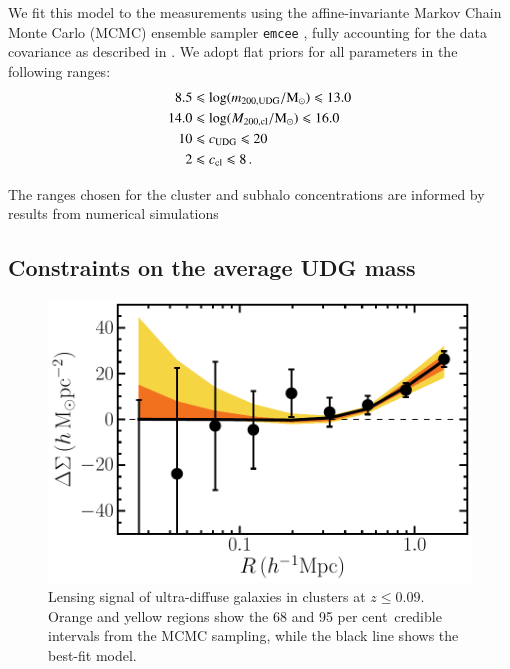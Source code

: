 \documentclass[usenatbib,fleqn]{mnras}
\def\percent{ per cent}
\begin{document}
We fit this model to the measurements using the affine-invariante Markov Chain Monte Carlo (MCMC) ensemble sampler \texttt{emcee} \citep{foreman13}, fully accounting for the data covariance as described in \cite{sifon15_kids,sifon17}. We adopt flat priors for all parameters in the following ranges:
\begin{equation}
\begin{split}
  8.5 &\leqslant \log(m_\mathrm{200,UDG}/\mathrm{M}_\odot) \leqslant 13.0 \\
 14.0 &\leqslant \log(M_\mathrm{200,cl}/\mathrm{M}_\odot) \leqslant 16.0 \\
   10 &\leqslant c_\mathrm{UDG} \leqslant 20 \\
    2 &\leqslant c_\mathrm{cl} \leqslant 8
 \,.
\end{split}
\end{equation}

The ranges chosen for the cluster and subhalo concentrations are informed by results from numerical simulations \citep[respectively]{dutton14,moline16}


\subsection{Constraints on the average UDG mass}

\begin{figure}
 \centerline{\includegraphics[width=0.95\linewidth]{esd.pdf}}
\caption{Lensing signal of ultra-diffuse galaxies in clusters at $z\leq0.09$. Orange and yellow regions show the 68 and 95\percent\ credible intervals from the MCMC sampling, while the black line shows the best-fit model.}
\label{f:esd}
\end{figure}

\end{document}
